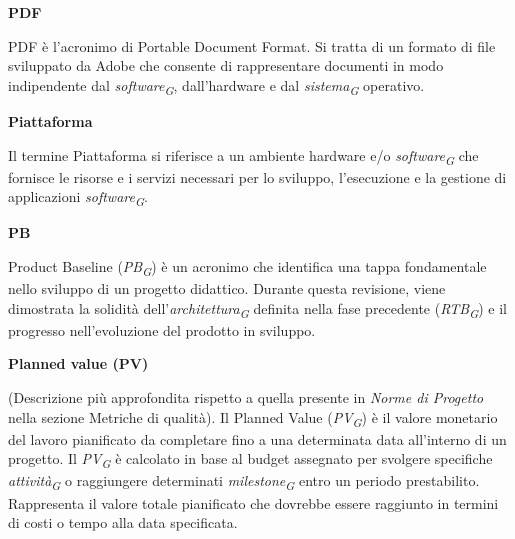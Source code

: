 \documentclass{article}
\begin{document}
\vspace{0.4cm}

\textbf{PDF}

\vspace{0.1cm}

PDF è l'acronimo di Portable Document Format. Si tratta di un formato di file sviluppato da Adobe che consente di rappresentare documenti in modo indipendente dal \textit{software}\textsubscript{\textit{G}}, dall'hardware e dal \textit{sistema}\textsubscript{\textit{G}} operativo.

\vspace{0.4cm}

\textbf{Piattaforma}

\vspace{0.1cm}

Il termine Piattaforma si riferisce a un ambiente hardware e/o \textit{software}\textsubscript{\textit{G}} che fornisce le risorse e i servizi necessari per lo sviluppo, l'esecuzione e la gestione di applicazioni \textit{software}\textsubscript{\textit{G}}.

\vspace{0.4cm}

\textbf{PB}

\vspace{0.1cm}

Product Baseline (\textit{PB}\textsubscript{\textit{G}}) è un acronimo che identifica una tappa fondamentale nello sviluppo di un progetto didattico. Durante questa revisione, viene dimostrata la solidità dell'\textit{architettura}\textsubscript{\textit{G}} definita nella fase precedente (\textit{RTB}\textsubscript{\textit{G}}) e il progresso nell'evoluzione del prodotto in sviluppo.

\vspace{0.4cm}

\textbf{Planned value (PV)}

\vspace{0.1cm}

(Descrizione più approfondita rispetto a quella presente in \textit{Norme di Progetto} nella sezione Metriche di qualità). 
Il Planned Value (\textit{PV}\textsubscript{\textit{G}}) è il valore monetario del lavoro pianificato da completare fino a una determinata data all'interno di un progetto. Il \textit{PV}\textsubscript{\textit{G}} è calcolato in base al budget assegnato per svolgere specifiche \textit{attività}\textsubscript{\textit{G}} o raggiungere determinati \textit{milestone}\textsubscript{\textit{G}} entro un periodo prestabilito. Rappresenta il valore totale pianificato che dovrebbe essere raggiunto in termini di costi o tempo alla data specificata.
\end{document}
